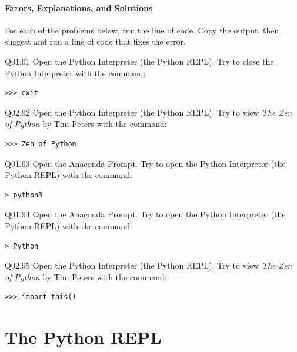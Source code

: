 \documentclass{book}
\newenvironment{problems}{}{}  %
\begin{document}
    




    
        \subsubsection{Errors, Explanations, and
Solutions}\label{errors-explanations-and-solutions}
    




    
        \begin{problems}
        For each of the problems below, run the line of code. Copy the output,
then suggest and run a line of code that fixes the error.

Q01.91 Open the Python Interpreter (the Python REPL). Try to close the
Python Interpreter with the command:

\begin{lstlisting}
>>> exit
\end{lstlisting}

Q02.92 Open the Python Interpreter (the Python REPL). Try to view
\emph{The Zen of Python} by Tim Peters with the command:

\begin{lstlisting}
>>> Zen of Python
\end{lstlisting}

Q01.93 Open the Anaconda Prompt. Try to open the Python Interpreter (the
Python REPL) with the command:

\begin{lstlisting}
> python3
\end{lstlisting}

Q01.94 Open the Anaconda Prompt. Try to open the Python Interpreter (the
Python REPL) with the command:

\begin{lstlisting}
> Python
\end{lstlisting}

Q02.95 Open the Python Interpreter (the Python REPL). Try to view
\emph{The Zen of Python} by Tim Peters with the command:

\begin{lstlisting}
>>> import this()
\end{lstlisting}
        \end{problems}

    




    
        \chapter{The Python REPL}\label{the-python-repl}
    
\end{document}
